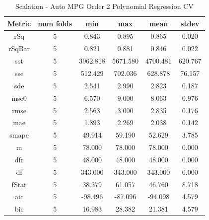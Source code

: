 \documentclass{article}
\begin{document}
\begin{table}[H]
\centering
\caption{Scalation - Auto MPG Order 2 Polynomial Regression CV}
\label{tab:Scalation - Auto MPG Order 2 Polynomial Regression CV}
\begin{tabular}{|c|c|c|c|c|c|}\hline
Metric & num folds & min & max & mean & stdev \\ \hline \hline
rSq & 5 & 0.843 & 0.895 & 0.865 & 0.020 \\ \hline
rSqBar & 5 & 0.821 & 0.881 & 0.846 & 0.022 \\ \hline
sst & 5 & 3962.818 & 5671.580 & 4700.481 & 620.767 \\ \hline
sse & 5 & 512.429 & 702.036 & 628.878 & 76.157 \\ \hline
sde & 5 & 2.541 & 2.990 & 2.823 & 0.187 \\ \hline
mse0 & 5 & 6.570 & 9.000 & 8.063 & 0.976 \\ \hline
rmse & 5 & 2.563 & 3.000 & 2.835 & 0.176 \\ \hline
mae & 5 & 1.893 & 2.269 & 2.038 & 0.142 \\ \hline
smape & 5 & 49.914 & 59.190 & 52.629 & 3.785 \\ \hline
m & 5 & 78.000 & 78.000 & 78.000 & 0.000 \\ \hline
dfr & 5 & 48.000 & 48.000 & 48.000 & 0.000 \\ \hline
df & 5 & 343.000 & 343.000 & 343.000 & 0.000 \\ \hline
fStat & 5 & 38.379 & 61.057 & 46.760 & 8.718 \\ \hline
aic & 5 & -98.496 & -87.096 & -94.098 & 4.579 \\ \hline
bic & 5 & 16.983 & 28.382 & 21.381 & 4.579 \\ \hline
\end{tabular}
\end{table}
\end{document}

